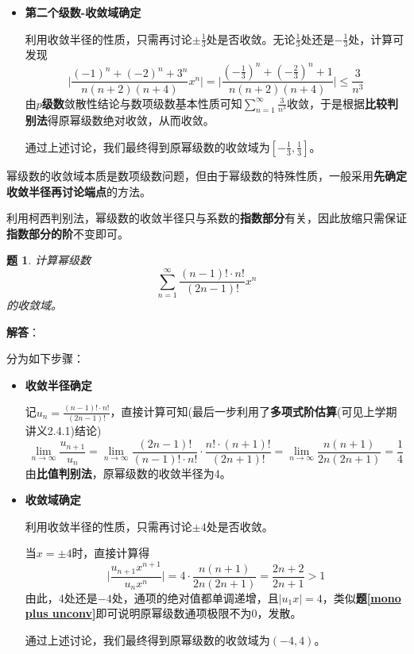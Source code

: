 \documentclass[a4paper,UTF8,fontset=windows,AutoFakeBold]{ctexart}
\newcommand*{\suminf}[1][n=1]{\sum_{#1}^\infty}
\newcommand*{\note}{\noindent *}
\theoremstyle{ex}
\newtheorem{exercise}{题}
\newcommand{\exref}[1]{\textbf{题\;\ref{#1}\;}}
\newcommand{\sol}[1]{{\vspace{5pt}\kaishu\noindent\textbf{解答}：\vspace{-3pt}
\begin{compactitem}
    \item[] #1
\end{compactitem}
}}
\begin{document}
\begin{framed}
{\begin{itemize}
        \item \textbf{第二个级数-收敛域确定}
        
        利用收敛半径的性质，只需再讨论$\pm\frac{1}{3}$处是否收敛。无论$\frac{1}{3}$处还是$-\frac{1}{3}$处，计算可发现
        $$\bigg|\frac{(-1)^n+(-2)^n+3^n}{n(n+2)(n+4)}x^n\bigg|=\bigg|\frac{(-\frac{1}{3})^n+(-\frac{2}{3})^n+1}{n(n+2)(n+4)}\bigg|\le\frac{3}{n^3}$$
        由\textbf{$p$级数}敛散性结论与数项级数基本性质可知$\suminf\frac{3}{n^3}$收敛，于是根据\textbf{比较判别法}得原幂级数绝对收敛，从而收敛。

        通过上述讨论，我们最终得到原幂级数的收敛域为$[-\frac{1}{3},\frac{1}{3}]$。
    \end{itemize}
}
\end{framed}

\note 幂级数的收敛域本质是数项级数问题，但由于幂级数的特殊性质，一般采用\textbf{先确定收敛半径再讨论端点}的方法。

\note 利用柯西判别法，幂级数的收敛半径只与系数的\textbf{指数部分}有关，因此放缩只需保证\textbf{指数部分的阶}不变即可。

\begin{framed}
\begin{exercise}
    计算幂级数
    $$\suminf\frac{(n-1)!\cdot n!}{(2n-1)!}x^n$$
    的收敛域。
\end{exercise}
\sol{
    分为如下步骤：
    \begin{itemize}
        \item \textbf{收敛半径确定}
        
        记$u_n=\frac{(n-1)!\cdot n!}{(2n-1)!}$，直接计算可知(最后一步利用了\textbf{多项式阶估算}(可见上学期讲义2.4.1)结论)
        $$\lim_{n\to\infty}\frac{u_{n+1}}{u_n}=\lim_{n\to\infty}\frac{(2n-1)!}{(n-1)!\cdot n!}\cdot\frac{n!\cdot(n+1)!}{(2n+1)!}=\lim_{n\to\infty}\frac{n(n+1)}{2n(2n+1)}=\frac{1}{4}$$
        由\textbf{比值判别法}，原幂级数的收敛半径为4。
        
        \item \textbf{收敛域确定}
        
        利用收敛半径的性质，只需再讨论$\pm4$处是否收敛。

        当$x=\pm4$时，直接计算得
        $$\bigg|\frac{u_{n+1}x^{n+1}}{u_nx^n}\bigg|=4\cdot\frac{n(n+1)}{2n(2n+1)}=\frac{2n+2}{2n+1}>1$$
        由此，4处还是$-4$处，通项的绝对值都单调递增，且$|u_1x|=4$，类似\exref{mono plus unconv}即可说明原幂级数通项极限不为0，发散。

        通过上述讨论，我们最终得到原幂级数的收敛域为$(-4,4)$。
    \end{itemize}
}
\end{framed}
\end{document}
